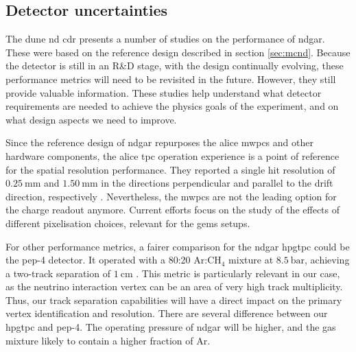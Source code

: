 \subsection{Detector uncertainties}

The \gls{dune} \gls{nd} \gls{cdr} \cite{DUNE2021NDCDR} presents a number of studies on the performance of \gls{ndgar}. These were based on the reference design described in section \ref{sec:mcnd}. Because the detector is still in an R\&D stage, with the design continually evolving, these performance metrics will need to be revisited in the future. However, they still provide valuable information. These studies help understand what detector requirements are needed to achieve the physics goals of the experiment, and on what design aspects we need to improve.

Since the reference design of \gls{ndgar} repurposes the \gls{alice} \gls{mwpc}s and other hardware components, the \gls{alice} \gls{tpc} operation experience is a point of reference for the spatial resolution performance. They reported a single hit resolution of $0.25~\mathrm{mm}$ and $1.50~\mathrm{mm}$ in the directions perpendicular and parallel to the drift direction, respectively \cite{ALICE2006}. Nevertheless, the \gls{mwpc}s are not the leading option for the charge readout anymore. Current efforts focus on the study of the effects of different pixelisation choices, relevant for the \gls{gem}s setups.

For other performance metrics, a fairer comparison for the \gls{ndgar} \gls{hpgtpc} could be the \gls{pep}-4 detector. It operated with a 80:20 $\mathrm{Ar}$:$\mathrm{CH}_{4}$ mixture at $8.5~\mathrm{bar}$, achieving a two-track separation of $1~\mathrm{cm}$ \cite{Stork1982,Aihara1983}. This metric is particularly relevant in our case, as the neutrino interaction vertex can be an area of very high track multiplicity. Thus, our track separation capabilities will have a direct impact on the primary vertex identification and resolution. There are several difference between our \gls{hpgtpc} and \gls{pep}-4. The operating pressure of \gls{ndgar} will be higher, and the gas mixture likely to contain a higher fraction of Ar.

